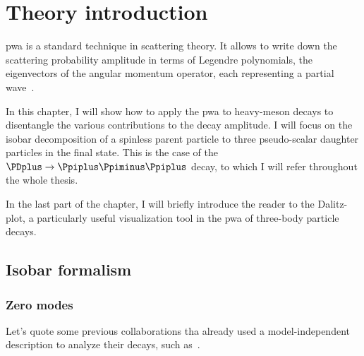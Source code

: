 \chapter{Theory introduction}
\label{chap:theory}

    \Ac{pwa} is a standard technique in scattering theory.
    It allows to write down the scattering probability amplitude in terms of Legendre polynomials, the eigenvectors of the angular momentum operator, each representing a partial wave~\cite[\S~11.2]{griffiths_intro_qm}.


    In this chapter, I will show how to apply the \ac{pwa} to heavy-meson decays to disentangle the various contributions to the decay amplitude.
    I will focus on the isobar decomposition of a spinless parent particle to three pseudo-scalar daughter particles in the final state.
    This is the case of the $\PDplus\to\Ppiplus\Ppiminus\Ppiplus$ decay, to which I will refer throughout the whole thesis.


    In the last part of the chapter, I will briefly introduce the reader to the Dalitz-plot, a particularly useful visualization tool in the \ac{pwa} of three-body particle decays.

    
    


    \section{Isobar formalism}
    

        \subsection{Zero modes}
        


    Let's quote some previous collaborations tha already used a model-independent description to analyze their decays, such as~\cite{PhysRevD.73.032004,Link200914}.
